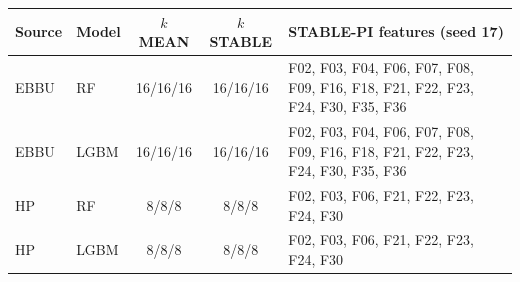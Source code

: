 \begin{tabular}{llccp{3.4cm}}
\toprule
Source & Model & $k$ MEAN & $k$ STABLE & STABLE-PI features (seed 17) \\
\midrule
EBBU & RF & 16/16/16 & 16/16/16 & \scriptsize F02, F03, F04, F06, F07, F08, F09, F16, F18, F21, F22, F23, F24, F30, F35, F36 \\
EBBU & LGBM & 16/16/16 & 16/16/16 & \scriptsize F02, F03, F04, F06, F07, F08, F09, F16, F18, F21, F22, F23, F24, F30, F35, F36 \\
HP & RF & 8/8/8 & 8/8/8 & \scriptsize F02, F03, F06, F21, F22, F23, F24, F30 \\
HP & LGBM & 8/8/8 & 8/8/8 & \scriptsize F02, F03, F06, F21, F22, F23, F24, F30 \\
\bottomrule
\end{tabular}
